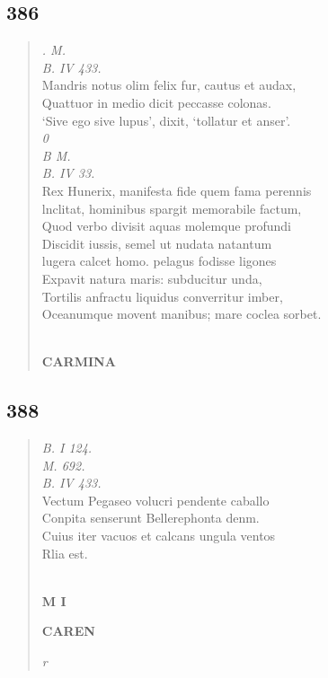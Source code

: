 \documentclass[11pt, a4paper]{report}
\begin{document}
            \subsection*{386}
      \begin{verse}
      \textit{. M.} \\ \textit{B. IV 433.} \\ Mandris notus olim felix fur, cautus et audax, \\ Quattuor in medio dicit peccasse colonas. \\ ‘Sive ego sive lupus’, dixit, ‘tollatur et anser’. \\ \textit{0} \\ \textit{B M.} \\ \textit{B. IV 33.} \\ Rex Hunerix, manifesta fide quem fama perennis \\ lnclitat, hominibus spargit memorabile factum, \\ Quod verbo divisit aquas molemque profundi \\ Discidit iussis, semel  \lbrack ut \rbrack  nudata natantum \\ lugera calcet homo. pelagus fodisse ligones \\ Expavit natura maris: subducitur unda, \\ Tortilis anfractu liquidus converritur imber, \\ Oceanumque movent manibus; mare coclea sorbet. \\ 
        ﻿\pagebreak 
    \begin{center} \textbf{CARMINA} \end{center} \marginpar{[296]} 
      \end{verse}
  
            \subsection*{388}
      \begin{verse}
      \textit{B. I 124.} \\ \textit{M. 692.} \\ \textit{B. IV 433.} \\ Vectum Pegaseo volucri pendente caballo \\ Conpita senserunt Bellerephonta denm. \\ Cuius iter vacuos et calcans ungula ventos \\ Rlia est. \\ 
        ﻿\pagebreak 
        ﻿\pagebreak 
    \begin{center} \textbf{M I} \end{center}\begin{center} \textbf{CAREN} \end{center}\textit{r} \\ 
      \end{verse}
  
\end{document}
